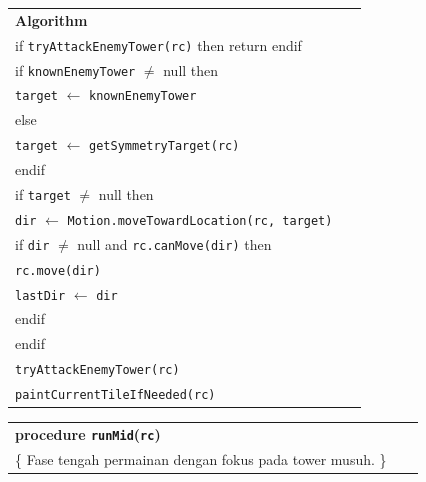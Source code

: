\documentclass{article}
\newenvironment{pseudobox}
{
\centering
\begin{longtable}{|p{0.94\linewidth}|}
\hline
}
{
\\ \hline
\end{longtable}
\vspace{0.05cm}
}
\begin{document}
\begin{enumerate}[label=\alph*.]
\begin{pseudobox}
\textbf{Algorithm} \\

\hspace*{1.5em}if \texttt{tryAttackEnemyTower(rc)} then return endif \\

\hspace*{1.5em}if \texttt{knownEnemyTower} $\neq$ null then \\
\hspace*{3em}\texttt{target} $\leftarrow$ \texttt{knownEnemyTower} \\
\hspace*{1.5em}else \\
\hspace*{3em}\texttt{target} $\leftarrow$ \texttt{getSymmetryTarget(rc)} \\
\hspace*{1.5em}endif \\

\hspace*{1.5em}if \texttt{target} $\neq$ null then \\

\hspace*{3em}\texttt{dir} $\leftarrow$ \texttt{Motion.moveTowardLocation(rc, target)} \\

\hspace*{3em}if \texttt{dir} $\neq$ null and \texttt{rc.canMove(dir)} then \\
\hspace*{4.5em}\texttt{rc.move(dir)} \\
\hspace*{4.5em}\texttt{lastDir} $\leftarrow$ \texttt{dir} \\
\hspace*{3em}endif \\

\hspace*{1.5em}endif \\

\hspace*{1.5em}\texttt{tryAttackEnemyTower(rc)} \\
\hspace*{1.5em}\texttt{paintCurrentTileIfNeeded(rc)}

\end{pseudobox}
\begin{pseudobox}
\textbf{procedure \texttt{runMid}(\texttt{rc})} \\
\{ Fase tengah permainan dengan fokus pada tower musuh. \}


\end{pseudobox}
\end{enumerate}
\end{document}
